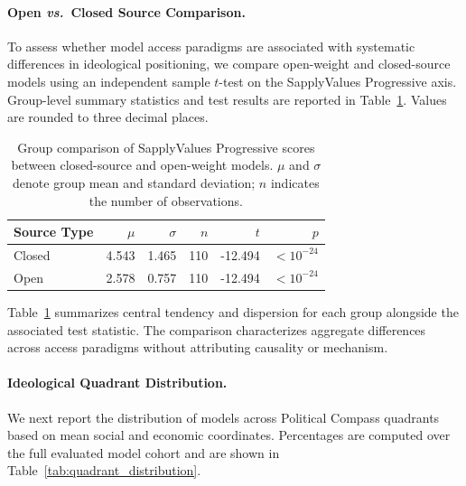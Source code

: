 \documentclass[11pt]{article}
\begin{document}
\paragraph{Open \textit{vs.}\ Closed Source Comparison.}
To assess whether model access paradigms are associated with systematic differences in ideological positioning, we compare open-weight and closed-source models using an independent sample $t$-test on the SapplyValues Progressive axis. Group-level summary statistics and test results are reported in Table~\ref{tab:open_closed_comparison}. Values are rounded to three decimal places.

\begin{table}[t]
\centering
\small
\setlength{\tabcolsep}{3pt}
\begin{tabular}{l r r r r r}
\toprule
\textbf{Source Type} & $\mu$ & $\sigma$ & $n$ & $t$ & $p$ \\
\midrule
Closed  & 4.543 & 1.465 & 110 & -12.494 & $<10^{-24}$ \\
Open  & 2.578 & 0.757 & 110 & -12.494 & $<10^{-24}$ \\
\bottomrule
\end{tabular}
\caption{Group comparison of SapplyValues Progressive scores between closed-source and open-weight models. $\mu$ and $\sigma$ denote group mean and standard deviation; $n$ indicates the number of observations.}
\label{tab:open_closed_comparison}
\end{table}

Table~\ref{tab:open_closed_comparison} summarizes central tendency and dispersion for each group alongside the associated test statistic. The comparison characterizes aggregate differences across access paradigms without attributing causality or mechanism.

\paragraph{Ideological Quadrant Distribution.}
We next report the distribution of models across Political Compass quadrants based on mean social and economic coordinates. Percentages are computed over the full evaluated model cohort and are shown in Table~\ref{tab:quadrant_distribution}.
\end{document}
